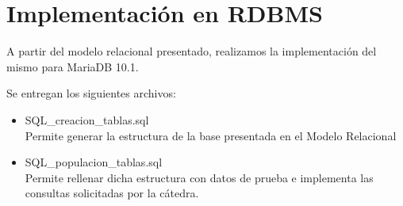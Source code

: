 \section{Implementación en RDBMS}
A partir del modelo relacional presentado, realizamos la implementación del mismo para MariaDB 10.1.

Se entregan los siguientes archivos:

\begin{itemize}
    \item SQL\_creacion\_tablas.sql \\
    Permite generar la estructura de la base presentada en el Modelo Relacional
    \item SQL\_populacion\_tablas.sql \\
    Permite rellenar dicha estructura con datos de prueba e implementa las consultas solicitadas por la cátedra.
\end{itemize}
